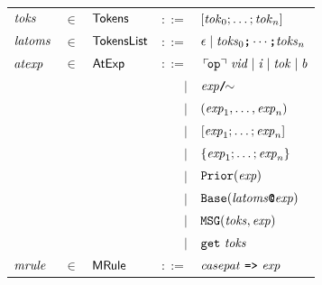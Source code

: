\documentclass[final]{article}
\begin{document}
\begin{figure}[t]
\begin{small}
\begin{center}
  \begin{tabular}{lllrl}
    $\mathit{toks}$
    & $\in$
    & $\mathsf{Tokens}$
    & $::=$
    & $[\mathit{tok}_0;\dots;\mathit{tok}_n]$
    \\

    $\mathit{latoms}$
    & $\in$
    & $\mathsf{TokensList}$
    & $::=$
    & $\epsilon\mid\mathit{toks}_0\textbf{\texttt{;}}\cdots\textbf{\texttt{;}}\mathit{toks}_n$
    \\

    $\mathit{atexp}$
    & $\in$
    & $\mathsf{AtExp}$
    & $::=$
    & $\,\ulcorner\!\mathtt{op}\urcorner\ \mathit{vid}
    \mid\mathit{i}
    \mid\mathit{tok}
    \mid\mathit{b}$
    \\
    &&& $\mid$
    & $\CONSquotient{\METAexp}$
    \\
    &&& $\mid$
    & $(\mathit{exp}_1,\dots,\mathit{exp}_n)$
    \\
    &&& $\mid$
    & $[\mathit{exp}_1;\dots;\mathit{exp}_n]$
    \\
    &&& $\mid$
    & $\{\mathit{exp}_1;\dots;\mathit{exp}_n\}$
    \\
    &&& $\mid$
    & $\mathtt{Prior}(\mathit{exp})$
    \\
    &&& $\mid$
    & $\mathtt{Base}(\mathit{latoms}\textbf{\texttt{@}}\mathit{exp})$
    \\
    &&& $\mid$
    & $\mathtt{MSG}(\mathit{toks},\mathit{exp})$
    \\
    &&& $\mid$
    & $\mathtt{get}\ \mathit{toks}$
    \\



    $\mathit{mrule}$
    & $\in$
    & $\mathsf{MRule}$
    & $::=$
    & $\mathit{casepat}\ \textbf{\texttt{=>}}\ \mathit{exp}$
    \\


\end{tabular}
\end{center}
\end{small}
\end{figure}
\end{document}

